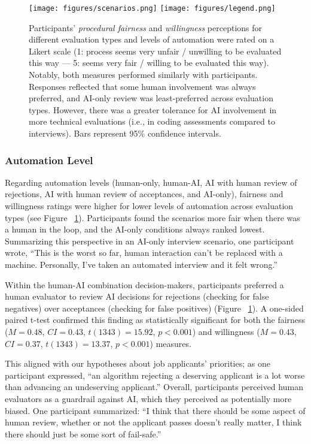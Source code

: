 \begin{figure}
\centering
  \texttt{[image: figures/scenarios.png]}
  \texttt{[image: figures/legend.png]}
  \caption{Participants' \textit{procedural fairness} and \textit{willingness} perceptions for different evaluation types and levels of automation were rated on a Likert scale (1: process seems very unfair / unwilling to be evaluated this way --- 5: seems very fair / willing to be evaluated this way). Notably, both measures performed similarly with participants. Responses reflected that some human involvement was always preferred, and AI-only review was least-preferred across evaluation types. However, there was a greater tolerance for AI involvement in more technical evaluations (i.e., in coding assessments compared to interviews). Bars represent 95\% confidence intervals.} 
  \label{fig:scenarios}
\end{figure}

\subsubsection{Automation Level} 
Regarding automation levels (human-only, human-AI, AI with human review of rejections, AI with human review of acceptances, and AI-only), fairness and willingness ratings were higher for lower levels of automation across evaluation types (see Figure ~\ref{fig:scenarios}). Participants found the scenarios more fair when there was a human in the loop, and the AI-only conditions always ranked lowest. Summarizing this perspective in an AI-only interview scenario, one participant wrote, ``This is the worst so far, human interaction can't be replaced with a machine. Personally, I've taken an automated interview and it felt wrong.''

Within the human-AI combination decision-makers, participants preferred a human evaluator to review AI decisions for rejections (checking for false negatives) over acceptances (checking for false positives) (Figure ~\ref{fig:scenarios}). A one-sided paired t-test confirmed this finding as statistically significant for both the fairness ($M= 0.48$, $CI= 0.43$, $t(1343)=15.92$, $p < 0.001$) and willingness ($M= 0.43$, $CI= 0.37$, $t(1343)=13.37$, $p < 0.001$) measures.

This aligned with our hypotheses about job applicants' priorities; as one participant expressed, ``an algorithm rejecting a deserving applicant is a lot worse than advancing an undeserving applicant.''
Overall, participants perceived human evaluators as a guardrail against AI, which they perceived as potentially more biased. One participant summarized: ``I think that there should be some aspect of human review, whether or not the applicant passes doesn't really matter, I think there should just be some sort of fail-safe.''

